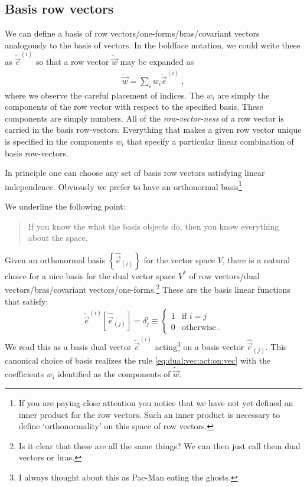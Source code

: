 \documentclass[
  11pt,
	colorful,
	raggedright,
]{tufte-style-thesis-flip}
\begin{document}
\subsection{Basis row vectors}

We can define a basis of row vectors/one-forms/bras/covariant vectors analogously to the basis of vectors. In the boldface notation, we could write these as $\tilde{\vec{e}}^{(i)}$ so that a row vector $\tilde{\vec w}$ may be expanded as
\begin{align}
 \tilde{\vec w} = \sum_i w_i \tilde{\vec{e}}^{(i)} \ ,
\end{align}
where we observe the careful placement of indices. The $w_i$ are simply the components of the row vector with respect to the specified basis. These components are simply numbers. All of the \emph{row-vector-ness} of a row vector is carried in the basis row-vectors. Everything that makes a given row vector unique is specified in the components $w_i$ that specify a particular linear combination of basis row-vectors.

In principle one can choose any set of basis row vectors satisfying linear independence. Obviously we prefer to have an orthonormal basis\footnote{If you are paying close attention you notice that we have not yet defined an inner product for the row vectors. Such an inner product is necessary to define `orthonormality' on this space of row vectors.}

We underline the following point:
\begin{quote}
If you know the what the basis objects do, then you know everything about the space.
\end{quote}
Given an orthonormal basis $\left\{\hat{\vec{e}}_{(i)}\right\}$ for the vector space $V$, there is a natural choice for a nice basis for the dual vector space $V^*$ of row vectors/dual vectors/bras/covariant vectors/one-forms.\footnote{Is it clear that these are all the same things? We can then just call them dual vectors or bras.} These are the basis linear functions that satisfy:
\begin{align}
  \tilde{\vec e}^{(i)} \left[\hat{\vec{e}}_{(j)}\right] = \delta^i_j
  \equiv
  \begin{cases}
  1 &\text{if } i=j\\
  0 &\text{otherwise} \ .
  \end{cases}
  \label{eq:canonical:dual:basis}
\end{align}
We read this as a basis dual vector $\tilde{\vec e}^{(i)}$ acting\footnote{I always thought about this as Pac-Man eating the ghosts.} on a basis vector $\hat{\vec{e}}_{(j)}$.
This canonical choice of basis realizes the rule \eqref{eq:dual:vec:act:on:vec} with the coefficients $w_i$ identified as the components of $\tilde{\vec w}$.
\end{document}
